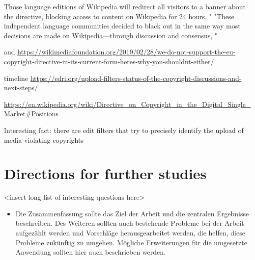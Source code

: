 Those language editions of Wikipedia will redirect all visitors to a banner about the directive, blocking access to content on Wikipedia for 24 hours. "
"These independent language communities decided to black out in the same way most decisions are made on Wikipedia—through discussion and consensus, "

and
\url{https://wikimediafoundation.org/2019/02/28/we-do-not-support-the-eu-copyright-directive-in-its-current-form-heres-why-you-shouldnt-either/}

timeline
\url{https://edri.org/upload-filters-status-of-the-copyright-discussions-and-next-steps/}

\url{https://en.wikipedia.org/wiki/Directive_on_Copyright_in_the_Digital_Single_Market#Positions}

Interesting fact: there are edit filters that try to precisely identify the upload of media violating copyrights


\section{Directions for further studies}
<insert long list of interesting questions here>

\begin{itemize}
	\item Die Zusammenfassung sollte das Ziel der Arbeit und die zentralen Ergebnisse beschreiben. Des Weiteren sollten auch bestehende Probleme bei der Arbeit aufgezählt werden und Vorschläge herausgearbeitet werden, die helfen, diese Probleme zukünftig zu umgehen. Mögliche Erweiterungen für die umgesetzte Anwendung sollten hier auch beschrieben werden.
\end{itemize}
